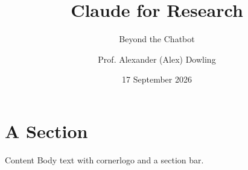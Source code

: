 \documentclass{beamer}
\title{Claude for Research}
\subtitle{Beyond the Chatbot}
\author{Prof. Alexander (Alex) Dowling}
\institute{Chemical and Biomolecular Engineering \\ adowling@nd.edu}
\date{17 September 2026}
\begin{document}
{
\begin{frame}[plain]\titlepage\end{frame}
}
\section{A Section}
\begin{frame}{Content}
Body text with cornerlogo and a section bar.
\end{frame}
\end{document}
